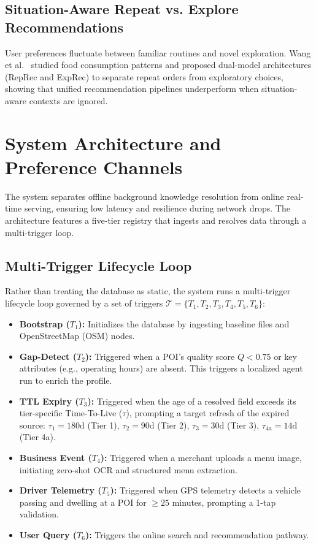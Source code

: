 \documentclass[acmsmall,screen]{acmart}
\begin{document}
\subsection{Situation-Aware Repeat vs. Explore Recommendations}
User preferences fluctuate between familiar routines and novel exploration. Wang et al.~\cite{wang2024righttool} studied food consumption patterns and proposed dual-model architectures (RepRec and ExpRec) to separate repeat orders from exploratory choices, showing that unified recommendation pipelines underperform when situation-aware contexts are ignored.

\section{System Architecture and Preference Channels}
The system separates offline background knowledge resolution from online real-time serving, ensuring low latency and resilience during network drops. The architecture features a five-tier registry that ingests and resolves data through a multi-trigger loop.

\subsection{Multi-Trigger Lifecycle Loop}
Rather than treating the database as static, the system runs a multi-trigger lifecycle loop governed by a set of triggers $\mathcal{T} = \{T_1, T_2, T_3, T_4, T_5, T_6\}$:
\begin{itemize}
    \item \textbf{Bootstrap ($T_1$):} Initializes the database by ingesting baseline files and OpenStreetMap (OSM) nodes.
    \item \textbf{Gap-Detect ($T_2$):} Triggered when a POI's quality score $Q < 0.75$ or key attributes (e.g., operating hours) are absent. This triggers a localized agent run to enrich the profile.
    \item \textbf{TTL Expiry ($T_3$):} Triggered when the age of a resolved field exceeds its tier-specific Time-To-Live ($\tau$), prompting a target refresh of the expired source: $\tau_1=180\text{d}$ (Tier 1), $\tau_2=90\text{d}$ (Tier 2), $\tau_3=30\text{d}$ (Tier 3), $\tau_{4a}=14\text{d}$ (Tier 4a).
    \item \textbf{Business Event ($T_4$):} Triggered when a merchant uploads a menu image, initiating zero-shot OCR and structured menu extraction.
    \item \textbf{Driver Telemetry ($T_5$):} Triggered when GPS telemetry detects a vehicle passing and dwelling at a POI for $\geq 25$ minutes, prompting a 1-tap validation.
    \item \textbf{User Query ($T_6$):} Triggers the online search and recommendation pathway.
\end{itemize}
\end{document}

